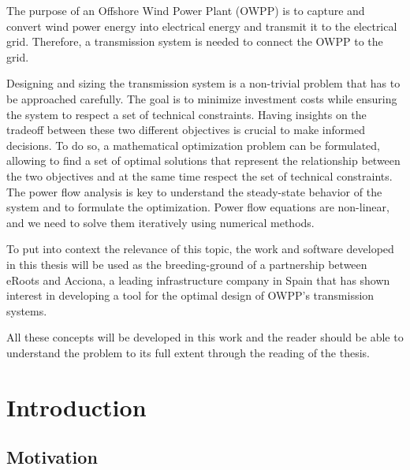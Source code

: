 \documentclass[a4paper,11pt, titlepage, twoside]{article}
\begin{document}
The purpose of an Offshore Wind Power Plant (OWPP) is to capture and convert wind power energy into electrical energy and transmit it to the electrical grid.
Therefore, a transmission system is needed to connect the OWPP to the grid. 

Designing and sizing the transmission system is a non-trivial problem that has to be approached carefully. The goal is to minimize investment costs while ensuring the system to respect a set of technical constraints. Having insights on the tradeoff between these two different objectives
is crucial to make informed decisions. To do so, a mathematical optimization problem can be formulated, allowing to find a set of optimal solutions that represent the relationship between the two objectives and at the same time respect the set of technical constraints.
The power flow analysis is key to understand the steady-state behavior of the system and to formulate the optimization. Power flow equations are non-linear, and we need to solve them iteratively using numerical methods. 

To put into context the relevance of this topic, the work and software developed in this thesis will be used
as the breeding-ground of a partnership between eRoots and Acciona, a leading infrastructure company in Spain that has shown interest in developing a tool for the optimal design
of OWPP's transmission systems.

All these concepts will be developed in this work and the reader should be able to understand the problem to its full extent through the reading of the thesis.






\section{Introduction}\label{Introduction}

\subsection{Motivation}
\end{document}
